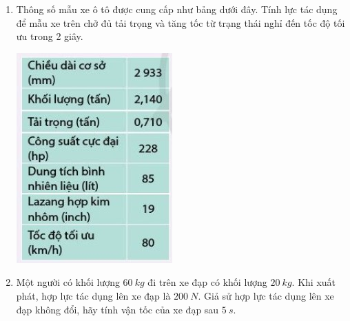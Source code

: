 \begin{enumerate}[label=\bfseries Câu \arabic*:]
{	}
	\item {}
	
	{
		
		Thông số mẫu xe ô tô được cung cấp như bảng dưới đây. Tính lực tác dụng để mẫu xe trên chở đủ tải trọng và tăng tốc từ trạng thái nghỉ đến tốc độ tối ưu trong 2 giây.
		
		\begin{center}
			\includegraphics[scale=1]{../figs/VN10-2022-PH-TP016-1.jpg}
		\end{center}
		
	}
	
	\item {}
	
	{
		
		Một người có khối lượng $\SI{60}{kg}$ đi trên xe đạp có khối lượng $\SI{20}{kg}$. Khi xuất phát, hợp lực tác dụng lên xe đạp là $\SI{200}{N}$. Giả sử hợp lực tác dụng lên xe đạp không đổi, hãy tính vận tốc của xe đạp sau $\SI{5}{s}$.
	}
	


\end{enumerate}
